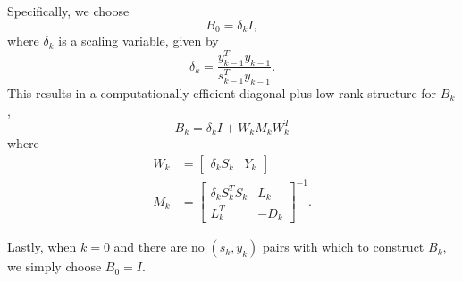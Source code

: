 \documentclass{article}
\begin{document}
Specifically, we choose
    \begin{equation} B_0 = \delta_k I, \end{equation}
    where $\delta_k$ is a scaling variable, given by
    \begin{equation} 
        \delta_k = \frac{y_{k-1}^T y_{k-1}}{s_{k-1}^T y_{k-1}}.
    \end{equation}
This results in a computationally-efficient 
    diagonal-plus-low-rank structure for $B_k$,
    \begin{equation}
    B_k = \delta_k I + W_k M_k W_k^T \label{lbfgs}
    \end{equation}
    where
    \begin{subequations}\begin{align}
        W_k &= \begin{bmatrix} \delta_k S_k & Y_k \end{bmatrix} \\
        M_k &= 
            \begin{bmatrix}
                \delta_k S_k^T S_k & L_k \\
                L_k^T & -D_k
            \end{bmatrix}^{-1}.
    \end{align}\end{subequations}

Lastly, when $k = 0$ and there are no $(s_k, y_k)$ pairs
    with which to construct $B_k$,
    we simply choose $B_0 = I$.
\end{document}
